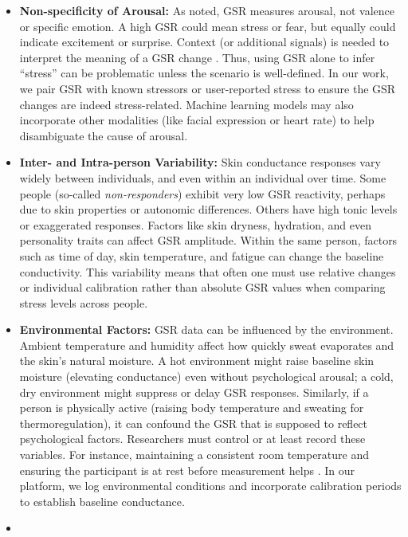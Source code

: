 \documentclass[12pt,a4paper]{article}
\begin{document}
\begin{itemize}
\item
  \textbf{Non-specificity of Arousal:} As noted, GSR measures arousal, not valence or specific emotion. A high GSR could mean stress or fear, but equally could indicate excitement or surprise. Context (or additional signals) is needed to interpret the meaning of a GSR change \citep{Boucsein2012}. Thus, using GSR alone to infer ``stress'' can be problematic unless the scenario is well-defined. In our work, we pair GSR with known stressors or user-reported stress to ensure the GSR changes are indeed stress-related. Machine learning models may also incorporate other modalities (like facial expression or heart rate) to help disambiguate the cause of arousal.
\item
  \textbf{Inter- and Intra-person Variability:} Skin conductance responses vary widely between individuals, and even within an individual over time. Some people (so-called \emph{non-responders}) exhibit very low GSR reactivity, perhaps due to skin properties or autonomic differences. Others have high tonic levels or exaggerated responses. Factors like skin dryness, hydration, and even personality traits can affect GSR amplitude. Within the same person, factors such as time of day, skin temperature, and fatigue can change the baseline conductivity. This variability means that often one must use relative changes or individual calibration rather than absolute GSR values when comparing stress levels across people.
\item
  \textbf{Environmental Factors:} GSR data can be influenced by the environment. Ambient temperature and humidity affect how quickly sweat evaporates and the skin's natural moisture. A hot environment might raise baseline skin moisture (elevating conductance) even without psychological arousal; a cold, dry environment might suppress or delay GSR responses. Similarly, if a person is physically active (raising body temperature and sweating for thermoregulation), it can confound the GSR that is supposed to reflect psychological factors. Researchers must control or at least record these variables. For instance, maintaining a consistent room temperature and ensuring the participant is at rest before measurement helps \citep{Boucsein2012}. In our platform, we log environmental conditions and incorporate calibration periods to establish baseline conductance.
\item

\end{itemize}
\end{document}

